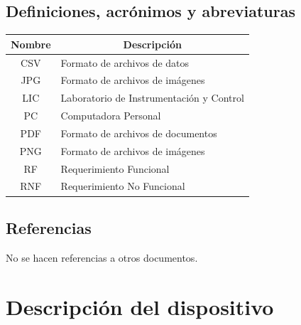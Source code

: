 \documentclass[titlepage, 12pt]{article}
\begin{document}
  \subsection{Definiciones, acrónimos y abreviaturas}
  \begin{table}[H]
    \centering
    \begin{tabular}{|c|l|}
    \hline
      \rowcolor[HTML]{C0C0C0}
      Nombre & \multicolumn{1}{c|}{\cellcolor[HTML]{C0C0C0}Descripción} \\ \hline
      CSV    & Formato de archivos de datos                             \\ \hline
      JPG    & Formato de archivos de imágenes                          \\ \hline
      LIC    & Laboratorio de Instrumentación y Control                 \\ \hline
      PC     & Computadora Personal                                     \\ \hline
      PDF    & Formato de archivos de documentos                        \\ \hline
      PNG    & Formato de archivos de imágenes                          \\ \hline
      RF     & Requerimiento Funcional                                  \\ \hline
      RNF    & Requerimiento No Funcional                               \\ \hline
    \end{tabular}
  \end{table}

  \subsection{Referencias}
  No se hacen referencias a otros documentos.


\section{Descripción del dispositivo}

\end{document}
